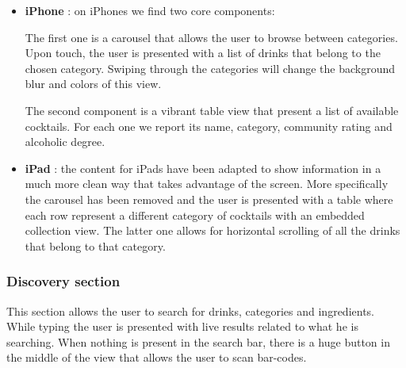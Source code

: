\documentclass[paper=a4, fontsize=12pt]{scrartcl}
\numberwithin{equation}{section}		%
\numberwithin{figure}{section}			%
\numberwithin{table}{section}				%
\begin{document}
\begin{itemize}
\item  \textbf{iPhone} : on iPhones we find two core components:

The first one is a carousel that allows the user to browse between categories. Upon touch, the user is presented with a list of drinks that belong to the chosen category. Swiping through the categories will change the background blur and colors of this view.

The second component is a vibrant table view that present a list of available cocktails. For each one we report its name, category, community rating and alcoholic degree.
\item \textbf{iPad} : the content for iPads have been adapted to show information in a much more clean way that takes advantage of the screen. More specifically the carousel has been removed and the user is presented with a table where each row represent a different category of cocktails with an embedded collection view.
The latter one allows for horizontal scrolling of all the drinks that belong to that category.
\end{itemize}

\subsubsection{Discovery section}\label{section:discover}

This section allows the user to search for drinks, categories and ingredients. While typing the user is presented with live results related to what he is searching. When nothing is present in the search bar, there is a huge button in the middle of the view that allows the user to scan bar-codes.
\end{document}
